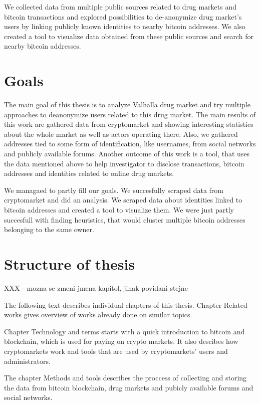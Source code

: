 \documentclass[
  digital, %
  table,   %
  lof,     %
  lot,     %
  oneside
]{fithesis3}
\begin{document}
We collected data from multiple public sources related to drug markets and bitcoin transactions and explored
 possibilities to de-anonymize drug market's users by linking publicly known identities to nearby bitcoin addresses.
We also created a tool to visualize data obtained from these public sources and search for nearby bitcoin addresses.

\section{Goals}

The main goal of this thesis is to analyze Valhalla drug market
and try multiple approaches to deanonymize users related to this drug market.
The main results of this work are gathered data from cryptomarket and
 showing interesting statistics about the whole market as well as actors operating there.
 Also, we gathered addresses tied to some form of identification, like usernames, from social networks and publicly available forums.
Another outcome of this work is a tool, that uses the data mentioned above to help investigator to disclose transactions,
bitcoin addresses and identities related to online drug markets.

We managaed to partly fill our goals. We succesfully scraped data from cryptomarket and did an analysis.
We scraped data about identities linked to bitcoin addresses and created a tool to visualize them.
We were just partly succesfull with finding heuristics, that would cluster multiple bitcoin addresses belonging to the same owner.

\section{Structure of thesis}
XXX - mozna se zmeni jmena kapitol, jinak povidani stejne

The following text describes individual chapters of this thesis.
Chapter Related works gives overview of works already done on similar topics. 

Chapter Technology and terms starts with a quick introduction to bitcoin and blockchain,
which is used for paying on crypto markets.
It also descibes how cryptomarkets work and tools that are used by cryptomarkets' users and administrators.

The chapter Methods and tools describes the proccess of collecting and storing the data from bitcoin blockchain,
drug markets and pubicly available forums and social networks. 
\end{document}

